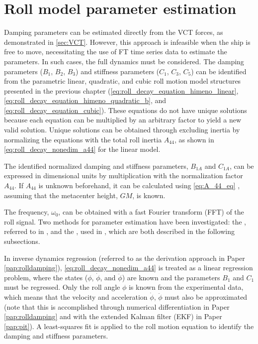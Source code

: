 \section{Roll model parameter estimation} \label{sec:_roll}
\noindent Damping parameters can be estimated directly from the VCT forces, as demonstrated in \autoref{sec:VCT}. However, this approach is infeasible when the ship is free to move, necessitating the use of FT time series data to estimate the parameters. In such cases, the full dynamics must be considered. The damping parameters ($B_1$, $B_2$, $B_3$) and stiffness parameters ($C_1$, $C_3$, $C_5$) can be identified from the parametric linear, quadratic, and cubic roll motion model structures presented in the previous chapter (\autoref{eq:roll_decay_equation_himeno_linear}, \autoref{eq:roll_decay_equation_himeno_quadratic_b}, and \autoref{eq:roll_decay_equation_cubic}).
These equations do not have unique solutions because each equation can be multiplied by an arbitrary factor to yield a new valid solution. Unique solutions can be obtained through excluding inertia by normalizing the equations with the total roll inertia $A_{44}$, as shown in \autoref{eq:roll_decay_nonedim_a44} for the linear model.



\noindent The identified normalized damping and stiffness parameters, $B_{1A}$ and $C_{1A}$, can be expressed in dimensional units by multiplication with the normalization factor $A_{44}$. If $A_{44}$ is unknown beforehand, it can be calculated using \autoref{eq:A_44_eq} \cite{piehlShipRollDamping2016}, assuming that the metacenter height, $GM$, is known.

The frequency, $\omega_0$, can be obtained with a fast Fourier transform (FFT) of the roll signal. 
Two methods for parameter estimation have been investigated: the , referred to in \textcite{imo1200InterimGuidelines2006}, and the , used in \textcite{soderAssessmentShipRoll2019}, which are both described in the following subsections. 

In inverse dynamics regression (referred to as the derivation approach in Paper \ref{pap:rolldamping}), \autoref{eq:roll_decay_nonedim_a44} is treated as a linear regression problem, where the states ($\phi$, $\dot{\phi}$, and $\ddot{\phi}$) are known and the parameters $B_1$ and $C_1$ must be regressed. Only the roll angle $\phi$ is known from the experimental data, which means that the velocity and acceleration $\dot{\phi}$, $\ddot{\phi}$ must also be approximated (note that this is accomplished through numerical differentiation in Paper \ref{pap:rolldamping} and with the extended Kalman filter (EKF) in Paper \ref{pap:pit}).
A least-squares fit is applied to the roll motion equation to identify the damping and stiffness parameters.

